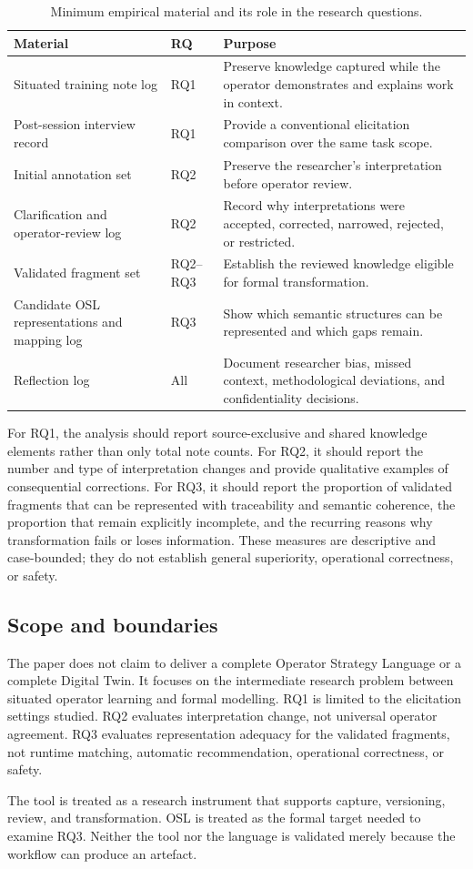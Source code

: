 \begin{table}[htbp]
\centering
\caption{Minimum empirical material and its role in the research questions.}
\label{tab:empirical-material}
\begin{tabularx}{\textwidth}{p{}p{}X}
\toprule
Material & RQ & Purpose \\
\midrule
Situated training note log & RQ1 & Preserve knowledge captured while the operator demonstrates and explains work in context. \\
Post-session interview record & RQ1 & Provide a conventional elicitation comparison over the same task scope. \\
Initial annotation set & RQ2 & Preserve the researcher's interpretation before operator review. \\
Clarification and operator-review log & RQ2 & Record why interpretations were accepted, corrected, narrowed, rejected, or restricted. \\
Validated fragment set & RQ2--RQ3 & Establish the reviewed knowledge eligible for formal transformation. \\
Candidate OSL representations and mapping log & RQ3 & Show which semantic structures can be represented and which gaps remain. \\
Reflection log & All & Document researcher bias, missed context, methodological deviations, and confidentiality decisions. \\
\bottomrule
\end{tabularx}
\end{table}

For RQ1, the analysis should report source-exclusive and shared knowledge elements rather than only total note counts. For RQ2, it should report the number and type of interpretation changes and provide qualitative examples of consequential corrections. For RQ3, it should report the proportion of validated fragments that can be represented with traceability and semantic coherence, the proportion that remain explicitly incomplete, and the recurring reasons why transformation fails or loses information. These measures are descriptive and case-bounded; they do not establish general superiority, operational correctness, or safety.

\subsection{Scope and boundaries}

The paper does not claim to deliver a complete Operator Strategy Language or a complete Digital Twin. It focuses on the intermediate research problem between situated operator learning and formal modelling. RQ1 is limited to the elicitation settings studied. RQ2 evaluates interpretation change, not universal operator agreement. RQ3 evaluates representation adequacy for the validated fragments, not runtime matching, automatic recommendation, operational correctness, or safety.

The tool is treated as a research instrument that supports capture, versioning, review, and transformation. OSL is treated as the formal target needed to examine RQ3. Neither the tool nor the language is validated merely because the workflow can produce an artefact.
